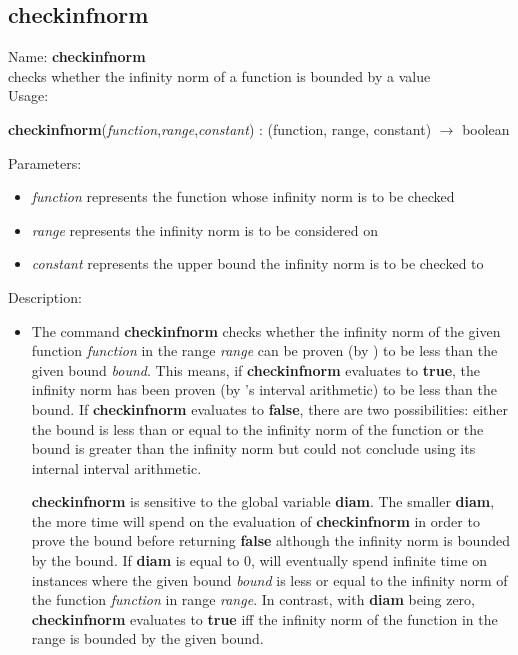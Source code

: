 \subsection{checkinfnorm}
\label{labcheckinfnorm}
\noindent Name: \textbf{checkinfnorm}\\
checks whether the infinity norm of a function is bounded by a value\\
\noindent Usage: 
\begin{center}
\textbf{checkinfnorm}(\emph{function},\emph{range},\emph{constant}) : (\textsf{function}, \textsf{range}, \textsf{constant}) $\rightarrow$ \textsf{boolean}
\\ 
\end{center}
Parameters: 
\begin{itemize}
\item \emph{function} represents the function whose infinity norm is to be checked
\item \emph{range} represents the infinity norm is to be considered on
\item \emph{constant} represents the upper bound the infinity norm is to be checked to
\end{itemize}
\noindent Description: \begin{itemize}

\item The command \textbf{checkinfnorm} checks whether the infinity norm of the given
   function \emph{function} in the range \emph{range} can be proven (by \sollya) to
   be less than the given bound \emph{bound}. This means, if \textbf{checkinfnorm}
   evaluates to \textbf{true}, the infinity norm has been proven (by \sollya's
   interval arithmetic) to be less than the bound. If \textbf{checkinfnorm} evaluates
   to \textbf{false}, there are two possibilities: either the bound is less than
   or equal to the infinity norm of the function or the bound is greater
   than the infinity norm but \sollya could not conclude using its
   internal interval arithmetic.
    
   \textbf{checkinfnorm} is sensitive to the global variable \textbf{diam}. The smaller \textbf{diam},
   the more time \sollya will spend on the evaluation of \textbf{checkinfnorm} in
   order to prove the bound before returning \textbf{false} although the infinity
   norm is bounded by the bound. If \textbf{diam} is equal to $0$, \sollya will
   eventually spend infinite time on instances where the given bound
   \emph{bound} is less or equal to the infinity norm of the function
   \emph{function} in range \emph{range}. In contrast, with \textbf{diam} being zero,
   \textbf{checkinfnorm} evaluates to \textbf{true} iff the infinity norm of the function in
   the range is bounded by the given bound.
\end{itemize}
